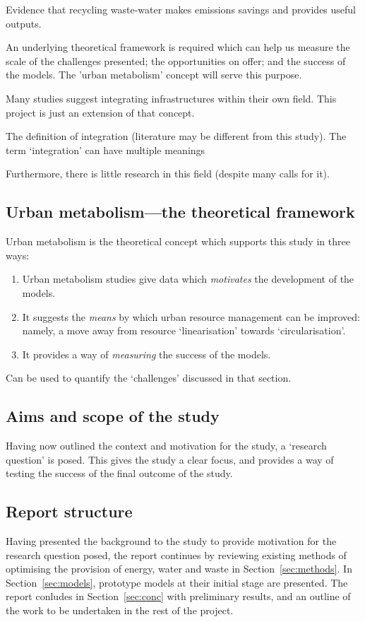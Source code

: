 \citep{Lundin2000} Evidence that recycling waste-water makes emissions savings and provides useful outputs.


An underlying theoretical framework is required which can help us measure the scale of the challenges presented; the opportunities on offer; and the success of the models. The 'urban metabolism' concept will serve this purpose.

Many studies suggest integrating infrastructures within their own field. This project is just an extension of that concept.

The definition of integration (literature may be different from this study).
The term `integration' can have multiple meanings

Furthermore, there is little research in this field (despite many calls for it).  

\subsection{Urban metabolism---the theoretical framework}
Urban metabolism is the theoretical concept which supports this study in three ways:
\begin{enumerate}
	\item Urban metabolism studies give data which \emph{motivates} the development of the models.
	\item It suggests the \emph{means} by which urban resource management can be improved: namely, a move away from resource `linearisation' towards `circularisation'.
\item It provides a way of \emph{measuring} the success of the models.
\end{enumerate}
Can be used to quantify the `challenges' discussed in that section.


\subsection{Aims and scope of the study}
Having now outlined the context and motivation for the study, a `research question' is posed. This gives the study a clear focus, and provides a way of testing the success of the final outcome of the study.


\subsection{Report structure}
Having presented the background to the study to provide motivation for the research question posed, the report continues by reviewing existing methods of optimising the provision of energy, water and waste in Section~\ref{sec:methods}. In Section~\ref{sec:models}, prototype models at their initial stage are presented. The report conludes in Section~\ref{sec:conc} with preliminary results, and an outline of the work to be undertaken in the rest of the project.

